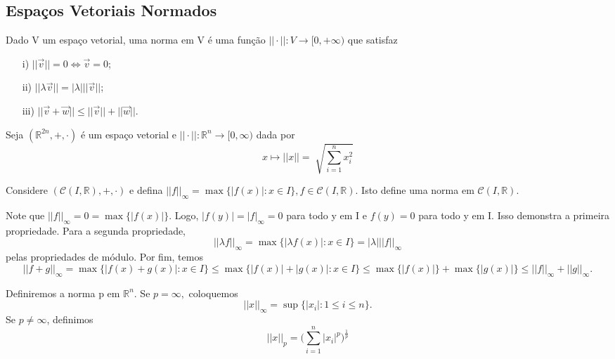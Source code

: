 \documentclass[MetricSpaces/metric_notes.tex]{subfiles}
\begin{document}
\subsection{Espaços Vetoriais Normados}
\begin{def*}
	Dado V um espaço vetorial, uma norma em V é uma função \(||\cdot ||:V\rightarrow [0, +\infty)\) que satisfaz
	\begin{itemize}
		\item[i)] \(||\vec{v}|| = 0 \Longleftrightarrow \vec{v}=0\);
		\item[ii)] \(||\lambda \vec{v}|| = |\lambda |||\vec{v}||\);
		\item[iii)] \(||\vec{v}+\vec{w}||\leq ||\vec{v}|| + ||\vec{w}||\).
	\end{itemize}
\end{def*}
\begin{example}
	Seja \((\mathbb{R}^{2n}, +, \cdot )\) é um espaço vetorial e \(||\cdot ||:\mathbb{R}^{n}\rightarrow [0, \infty)\) dada por
	\[
		x\mapsto ||x|| = \sqrt[]{\sum\limits_{i=1}^{n}x_{i}^{2}}
	\]
\end{example}
\begin{example}
	Considere \((\mathcal{C}(I, \mathbb{R}), +, \cdot )\) e defina \(||f||_{\infty} = \max \biggl\{|f(x)|: x\in I\biggr\}, f\in \mathcal{C}(I, \mathbb{R}).\) Isto define uma norma em
	\(\mathcal{C}(I, \mathbb{R}).\)

	Note que \(||f||_{\infty} = 0 = \max\{|f(x)|\}.\) Logo, \(|f(y)| = |f|_{\infty} = 0\) para todo y em I e \(f(y) = 0\) para todo y em I.
	Isso demonstra a primeira propriedade. Para a segunda propriedade,
	\[
		||\lambda f||_{\infty} = \max\{|\lambda f(x)|: x\in I\} = |\lambda |||f||_{\infty}
	\]
	pelas propriedades de módulo. Por fim, temos
	\[
		||f+g||_{\infty} = \max\{|f(x)+g(x)|: x\in I\}\leq \max\{|f(x)| + |g(x)|: x\in I\}\leq \max\{|f(x)|\} + \max\{|g(x)|\}\leq ||f||_{\infty} + ||g||_{\infty}.
	\]
\end{example}
\begin{example}
	Definiremos a norma p em \(\mathbb{R}^{n}\). Se \(p=\infty,\) coloquemos
	\[
		||x||_{\infty} = \sup\{|x_{i}|: 1\leq i\leq n\}.
	\]
	Se \(p\neq\infty\), definimos
	\[
		||x||_{p} = \biggl(\sum\limits_{i=1}^{n}|x_{i}|^{p}\biggr)^{\frac{1}{p}}
	\]
\end{example}
\end{document}
